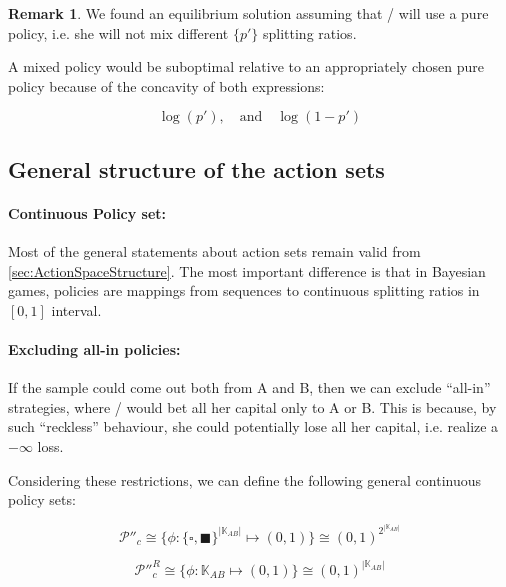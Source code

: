 \documentclass{article}
\newcommand{\wb}{\square}
\newcommand{\bb}{\blacksquare}
\theoremstyle{definition}
\newtheorem*{remark}{Remark}
\begin{document}
\begin{remark}
    We found an equilibrium solution assuming that \PI/ will use a pure policy, i.e. she will not mix different $\{p'\}$ splitting ratios.

    A mixed policy would be suboptimal relative to an appropriately chosen pure policy because of the concavity of both expressions:

    \begin{equation}
        \log(p'), \quad \mathrm{and} \quad \log(1-p')
    \end{equation}

\end{remark}


\subsection{General structure of the action sets}

\paragraph{Continuous Policy set:}

Most of the general statements about action sets remain valid from \ref{sec:ActionSpaceStructure}. The most important difference is that in Bayesian games, policies are mappings from sequences to continuous splitting ratios in $[0,1]$ interval.

\paragraph{Excluding all-in policies:}

If the sample could come out both from A and B, then we can exclude ``all-in'' strategies, where \PI/ would bet all her capital only to A or B. This is because, by such ``reckless'' behaviour, she could potentially lose all her capital, i.e. realize a $-\infty$ loss.

Considering these restrictions, we can define the following general continuous policy sets:

\begin{equation}
    \mathcal{P}''_c \cong \{ \phi : \{\wb,\bb\}^{|\mathbb{K}_{AB}|} \mapsto (0,1) \} \cong (0,1)^{2^{|\mathbb{K}_{AB}|}}
\end{equation}

\begin{equation}
    \mathcal{P}''^R_c \cong \{ \phi : \mathbb{K}_{AB} \mapsto (0,1) \} \cong (0,1)^{|\mathbb{K}_{AB}|}
\end{equation}
\end{document}
